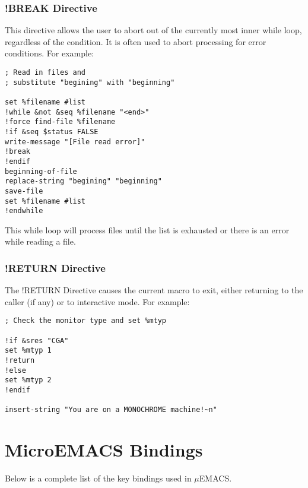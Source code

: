 \subsection{!BREAK Directive}

This directive allows the user to abort out of the currently most inner
while loop, regardless of the condition. It is often used to abort
processing for error conditions. For example:

\begin{verbatim}
; Read in files and 
; substitute "begining" with "beginning"

set %filename #list
!while &not &seq %filename "<end>"
!force find-file %filename
!if &seq $status FALSE
write-message "[File read error]"
!break
!endif
beginning-of-file
replace-string "begining" "beginning"
save-file
set %filename #list
!endwhile
\end{verbatim}

This while loop will process files until the list is exhausted or there
is an error while reading a file.

\subsection{!RETURN Directive}

The !RETURN Directive causes the current macro to exit, either
returning to the caller (if any) or to interactive mode. For example:

\begin{verbatim}
; Check the monitor type and set %mtyp

!if &sres "CGA"
set %mtyp 1
!return
!else
set %mtyp 2
!endif

insert-string "You are on a MONOCHROME machine!~n"
\end{verbatim}

\appendix
\chapter{MicroEMACS Bindings}

Below is a complete list of the key bindings used in $\mu$EMACS.

